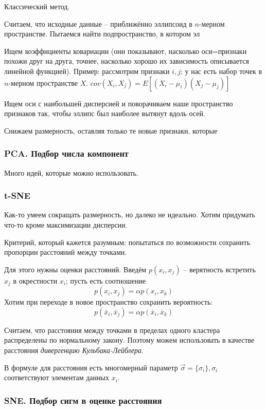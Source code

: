 \documentclass[main.tex]{subfiles}
\begin{document}
Классический метод.

Считаем, что исходные данные -- приближённо эллипсоид в $n$-мерном пространстве.
Пытаемся найти подпространство, в котором эл

Ищем коэффициенты ковариации (они показывают, насколько оси=признаки похожи друг на друга, точнее, насколько хорошо их зависимость описывается линейной функцией).
Пример: рассмотрим признаки $ i,j $; у нас есть набор точек в $n$-мерном пространстве $ X $.
$ cov(X_i, X_j) = E[(X_i - \mu_i)(X_j - \mu_j)] $

Ищем оси с наибольшей дисперсией и поворачиваем наше пространство признаков так, чтобы эллипс был наиболее вытянут вдоль осей.

Снижаем размерность, оставляя только те новые признаки, которые

\subsubsection{ PCA. Подбор числа компонент }


Много идей, которые можно использовать.

\subsubsection{t-SNE}

Как-то умеем сокращать размерность, но далеко не идеально.
Хотим придумать что-то кроме максимизации дисперсии.

Критерий, который кажется разумным: попытаться по возможности сохранить пропорции расстояний между точками.

Для этого нужны оценки расстояний.
Введём $ p(x_i, x_j) $ -- верятность встретить $x_j$ в окрестности $x_i$; пусть есть соотношение
$$ p(x_i, x_j) = \alpha p(x_i, x_k) $$
Хотим при переходе в новое пространство сохранить вероятность:
$$ p(\bar x_i, \bar x_j) = \alpha p(\bar x_i, \bar x_k) $$

Считаем, что расстояния между точками в пределах одного кластера распределены по нормальному закону.
Поэтому можем использовать в качестве расстояния \emph{дивергенцию Кульбака-Лейблера}.

В формуле для расстояния есть многомерный параметр $ \vec \sigma = \{ \sigma_i \}, \sigma_i  $ соответствуют элементам данных $x_i$.

\subsubsection{ SNE. Подбор сигм в оценке расстояния }
\end{document}
